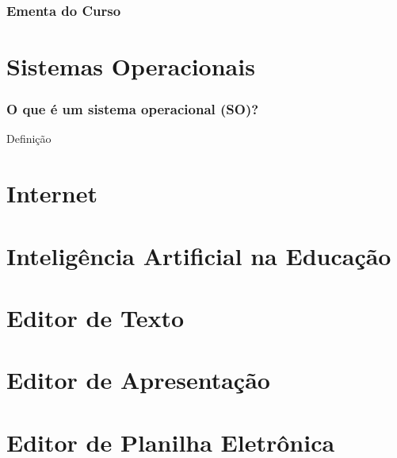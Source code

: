 \documentclass[aspectratio=169]{beamer} %
\begin{document}
\begin{frame}
	\frametitle{Ementa do Curso}
  	\tableofcontents
\end{frame}


\section{Sistemas Operacionais}

\begin{frame}
	\frametitle{O que é um sistema operacional (SO)?}
	
	\begin{block}{Definição}
		
	\end{block}
\end{frame}

\section{Internet}

\section{Inteligência Artificial na Educação}

\section{Editor de Texto}

\section{Editor de Apresentação}

\section{Editor de Planilha Eletrônica}
\end{document}
